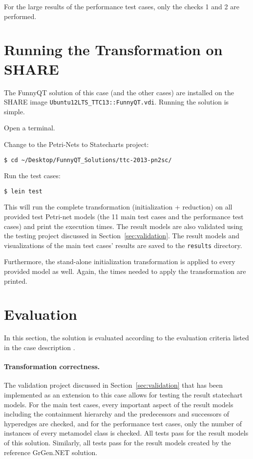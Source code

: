 \documentclass[11pt]{article}
\begin{document}
For the large results of the performance test cases, only the checks 1 and 2
are performed.


\section{Running the Transformation on SHARE}
\label{sec:run-transformation}

The FunnyQT solution of this case (and the other cases) are
installed on the SHARE image \verb|Ubuntu12LTS_TTC13::FunnyQT.vdi|.  Running
the solution is simple.

\begin{compactenum}
\item Open a terminal.
\item Change to the Petri-Nets to Statecharts project:

  \verb|$ cd ~/Desktop/FunnyQT_Solutions/ttc-2013-pn2sc/|
\item Run the test cases:

  \verb|$ lein test|
\end{compactenum}

This will run the complete transformation (initialization + reduction) on all
provided test Petri-net models (the 11 main test cases and the performance test
cases) and print the execution times.  The result models are also validated
using the testing project discussed in Section~\ref{sec:validation}.  The
result models and visualizations of the main test cases' results are saved to
the \verb|results| directory.

Furthermore, the stand-alone initialization transformation is applied to every
provided model as well.  Again, the times needed to apply the transformation
are printed.


\section{Evaluation}
\label{sec:evaluation}

In this section, the solution is evaluated according to the evaluation criteria
listed in the case description \cite{pn2sccasedesc}.

\paragraph{Transformation correctness.}

The validation project discussed in Section~\ref{sec:validation} that has been
implemented as an extension to this case allows for testing the result
statechart models.  For the main test cases, every important aspect of the
result models including the containment hierarchy and the predecessors and
successors of hyperedges are checked, and for the performance test cases, only
the number of instances of every metamodel class is checked.  All tests pass
for the result models of this solution.  Similarly, all tests pass for the
result models created by the reference GrGen.NET solution.
\end{document}
